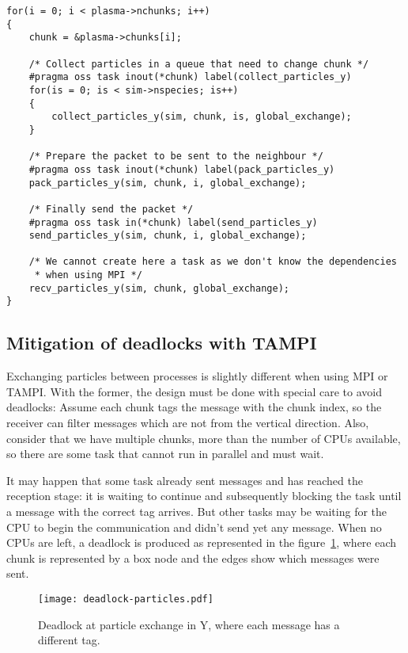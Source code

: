 \begin{lstlisting}
for(i = 0; i < plasma->nchunks; i++)
{
	chunk = &plasma->chunks[i];

	/* Collect particles in a queue that need to change chunk */
	#pragma oss task inout(*chunk) label(collect_particles_y)
	for(is = 0; is < sim->nspecies; is++)
	{
		collect_particles_y(sim, chunk, is, global_exchange);
	}

	/* Prepare the packet to be sent to the neighbour */
	#pragma oss task inout(*chunk) label(pack_particles_y)
	pack_particles_y(sim, chunk, i, global_exchange);

	/* Finally send the packet */
	#pragma oss task in(*chunk) label(send_particles_y)
	send_particles_y(sim, chunk, i, global_exchange);

	/* We cannot create here a task as we don't know the dependencies
	 * when using MPI */
	recv_particles_y(sim, chunk, global_exchange);
}
\end{lstlisting}

\subsection{Mitigation of deadlocks with TAMPI}

Exchanging particles between processes is slightly different when using MPI or 
TAMPI. With the former, the design must be done with special care to avoid 
deadlocks: Assume each chunk tags the message with the chunk index, so the 
receiver can filter messages which are not from the vertical direction. Also, 
consider that we have multiple chunks, more than the number of CPUs available, 
so there are some task that cannot run in parallel and must wait.

It may happen that some task already sent messages and has reached the reception 
stage: it is waiting to continue and subsequently blocking the task until a 
message with the correct tag arrives. But other tasks may be waiting for the CPU 
to begin the communication and didn't send yet any message. When no CPUs are 
left, a deadlock is produced as represented in the 
figure~\ref{fig:comm_deadlock}, where each chunk is represented by a box node 
and the edges show which messages were sent.
%
\begin{figure}
\centering
\texttt{[image: deadlock-particles.pdf]}
\caption{Deadlock at particle exchange in Y, where each message has a different 
tag.}
\label{fig:comm_deadlock}
\end{figure}

